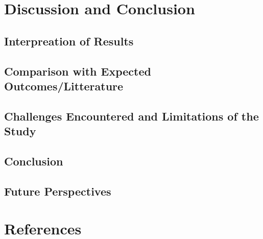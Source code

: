 \documentclass[11pt]{article}
\begin{document}
		\section{Discussion and Conclusion}
			\subsection{Interpreation of Results}
			\subsection{Comparison with Expected Outcomes/Litterature}
			\subsection{Challenges Encountered and Limitations of the Study}
			\subsection{Conclusion}
			\subsection{Future Perspectives}
			
		\section{References}
		
	
\end{document}
